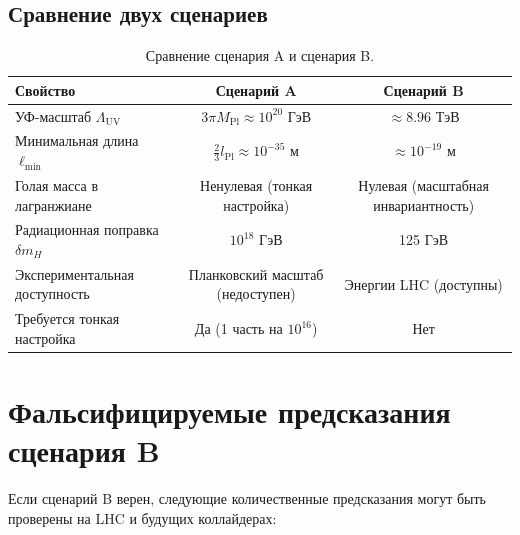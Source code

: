 \documentclass[11pt,a4paper]{article}
\newcommand{\Mpl}{M_{\mathrm{Pl}}}
\newcommand{\Lpl}{l_{\mathrm{Pl}}}
\newcommand{\Lmin}{\ell_{\min}}
\newcommand{\LUV}{\Lambda_{\mathrm{UV}}}
\theoremstyle{remark}
\begin{document}
	\subsection{Сравнение двух сценариев}
	
	\begin{table}[H]
		\centering
		\caption{Сравнение сценария A и сценария B.}
		\label{tab:scenarios}
		\small
		\begin{tabular}{@{}lcc@{}}
			\toprule
			\textbf{Свойство} & \textbf{Сценарий A} & \textbf{Сценарий B} \\
			\midrule
			УФ-масштаб \(\LUV\) & \(3\pi\Mpl \approx 10^{20}\) ГэВ & \(\approx 8.96\) ТэВ \\
			Минимальная длина \(\Lmin\) & \(\frac{2}{3}\Lpl \approx 10^{-35}\) м & \(\approx 10^{-19}\) м \\
			Голая масса в лагранжиане & Ненулевая (тонкая настройка) & Нулевая (масштабная инвариантность) \\
			Радиационная поправка \(\delta m_H\) & \(10^{18}\) ГэВ & 125 ГэВ \\
			Экспериментальная доступность & Планковский масштаб (недоступен) & Энергии LHC (доступны) \\
			Требуется тонкая настройка & Да (1 часть на \(10^{16}\)) & Нет \\
			\bottomrule
		\end{tabular}
	\end{table}
	
	\section{Фальсифицируемые предсказания сценария B}
	\label{sec:predictions}
	
	Если сценарий B верен, следующие количественные предсказания могут быть проверены на LHC и будущих коллайдерах:
	
\end{document}
